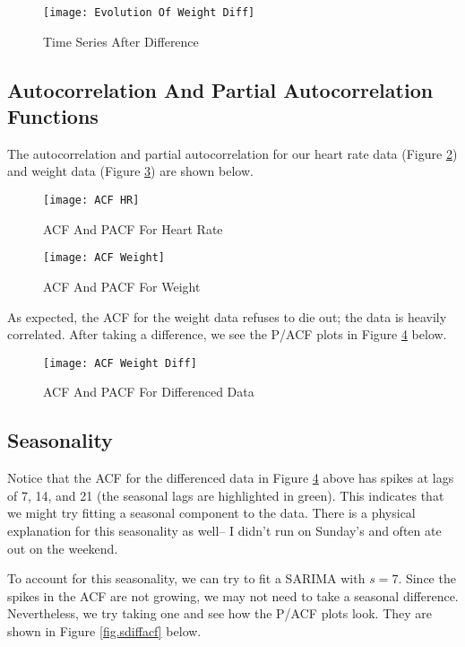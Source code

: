 \documentclass[12pt, letterpaper]{article}
\theoremstyle{definition}
\numberwithin{equation}{section}
\newcommand{\+}[1]{+_{\scalebox{.375}{#1}}}
\newcommand{\1}{\mathbbm{1}}
\begin{document}
\begin{figure}[H]
	\centering
	\texttt{[image: Evolution Of Weight Diff]}
	\caption{Time Series After Difference}
	\label{fig.after}
\end{figure}




\subsection{Autocorrelation And Partial Autocorrelation Functions}
\label{subsection.acf}

The autocorrelation and partial autocorrelation for our heart rate data (Figure \ref{fig.adfhr}) and weight data (Figure \ref{fig.adfweight}) are shown below.

\begin{figure}[H]
	\centering
	\texttt{[image: ACF HR]}
	\caption{ACF And PACF For Heart Rate}
	\label{fig.adfhr}
\end{figure}
\vspace{-0.75cm}
\begin{figure}[H]
	\centering
	\texttt{[image: ACF Weight]}
	\caption{ACF And PACF For Weight}
	\label{fig.adfweight}
\end{figure}

As expected, the ACF for the weight data refuses to die out; the data is heavily correlated. After taking a difference, we see the P/ACF plots in Figure \ref{fig.acfweightdiff} below.

\begin{figure}[H]
	\centering
	\texttt{[image: ACF Weight Diff]}
	\caption{ACF And PACF For Differenced Data}
	\label{fig.acfweightdiff}
\end{figure}


\subsection{Seasonality}
\label{subsection.seasonality}

Notice that the ACF for the differenced data in Figure \ref{fig.acfweightdiff} above has spikes at lags of 7, 14, and 21 (the seasonal lags are highlighted in green). This indicates that we might try fitting a seasonal component to the data. There is a physical explanation for this seasonality as well-- I didn't run on Sunday's and often ate out on the weekend.
\vspace{\baselineskip}

To account for this seasonality, we can try to fit a SARIMA with $s=7$. Since the spikes in the ACF are not growing, we may not need to take a seasonal difference. Nevertheless, we try taking one and see how the P/ACF plots look. They are shown in Figure \ref{fig.sdiffacf} below.
\end{document}
